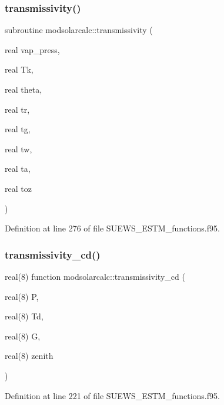 \subsubsection{\texorpdfstring{transmissivity()}{transmissivity()}}
{\footnotesize\ttfamily subroutine modsolarcalc\+::transmissivity (\begin{DoxyParamCaption}\item[{real}]{vap\+\_\+press,  }\item[{real}]{Tk,  }\item[{real}]{theta,  }\item[{real}]{tr,  }\item[{real}]{tg,  }\item[{real}]{tw,  }\item[{real}]{ta,  }\item[{real}]{toz }\end{DoxyParamCaption})}



Definition at line 276 of file S\+U\+E\+W\+S\+\_\+\+E\+S\+T\+M\+\_\+functions.\+f95.

\mbox{\label{namespacemodsolarcalc_ad567772df0c379c013b1bec090be214a}} 
\subsubsection{\texorpdfstring{transmissivity\+\_\+cd()}{transmissivity\_cd()}}
{\footnotesize\ttfamily real(8) function modsolarcalc\+::transmissivity\+\_\+cd (\begin{DoxyParamCaption}\item[{real(8)}]{P,  }\item[{real(8)}]{Td,  }\item[{real(8)}]{G,  }\item[{real(8)}]{zenith }\end{DoxyParamCaption})}



Definition at line 221 of file S\+U\+E\+W\+S\+\_\+\+E\+S\+T\+M\+\_\+functions.\+f95.

